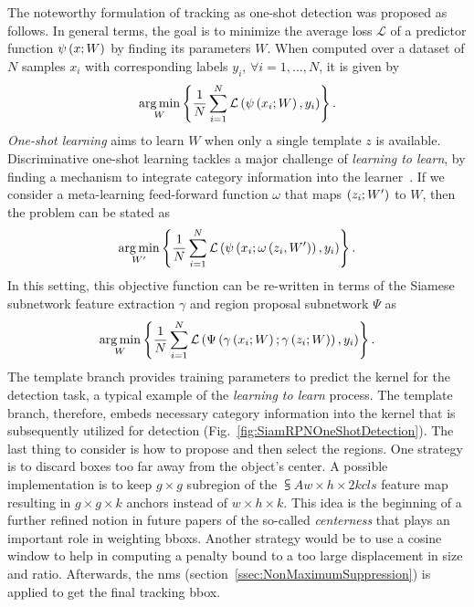 The noteworthy formulation of tracking as one-shot detection was proposed as follows. In general terms, the goal is to minimize the average loss $\mathcal{L}$ of a predictor function ${\psi} \left( x; W \right)$ by finding its parameters $W$. When computed over a dataset of $N$ samples $x_i$ with corresponding labels $y_i$, $\forall i = 1, \dots, N$, it is given by
\begin{equation}
    \label{eq:SiamRPNOneShotGeneral}
    \underset{W}{\operatorname*{arg\,min}}
    \left\{ {
        \frac{1}{N}
        \sum_{i = 1}^{N}
        {\mathcal{L}} \left( 
            {\psi} \left( x_i; W \right),
            y_i
         \right)
    } \right\}.
\end{equation}
\emph{One-shot learning} aims to learn $W$ when only a single template $z$ is available.
Discriminative one-shot learning tackles a major challenge of \emph{learning to learn}, by finding a mechanism to integrate category information into the learner~\cite{bertinetto2016oneshot}. If we consider a meta-learning feed-forward function $\omega$ that maps $\left( {z_i; W'} \right)$ to $W$, then the problem can be stated as
\begin{equation}
    \label{eq:SiamRPNOneShotMetaLearning}
    \underset{W'}{\operatorname*{arg\,min}}
    \left\{ {
        \frac{1}{N}
        \sum_{i = 1}^{N}
        {\mathcal{L}} \left( 
            {\psi} \left( x_i; {\omega} \left( z_i, W' \right) \right),
            y_i
         \right)
    } \right\}.
\end{equation}
In this setting, this objective function can be re-written in terms of the Siamese subnetwork feature extraction $\gamma$ and region proposal subnetwork $\Psi$ as
\begin{equation}
    \label{eq:SiamRPNOneShoCombo}
    \underset{W}{\operatorname*{arg\,min}}
    \left\{ {
        \frac{1}{N}
        \sum_{i = 1}^{N}
        {\mathcal{L}} \left( 
            {\Psi} \left( {\gamma} \left( x_i; W \right); {\gamma} \left( z_i; W \right) \right),
            y_i
         \right)
    } \right\}.
\end{equation}
The template branch provides training parameters to predict the kernel for the detection task, a typical example of the \emph{learning to learn} process. The template branch, therefore, embeds necessary category information into the kernel that is subsequently utilized for detection (Fig.~\ref{fig:SiamRPNOneShotDetection}). The last thing to consider is how to propose and then select the regions. One strategy is to discard boxes too far away from the object's center. A possible implementation is to keep $g \times g$ subregion of the $\subsup{A}{w \times h \times 2k}{cls}$ feature map resulting in $g \times g \times k$ anchors instead of $w \times h \times k$. This idea is the beginning of a further refined notion in future papers of the so-called \emph{centerness} that plays an important role in weighting \glspl{bbox}. Another strategy would be to use a cosine window to help in computing a penalty bound to a too large displacement in size and ratio. Afterwards, the \gls{nms} (section~\ref{ssec:NonMaximumSuppression}) is applied to get the final tracking \gls{bbox}.

